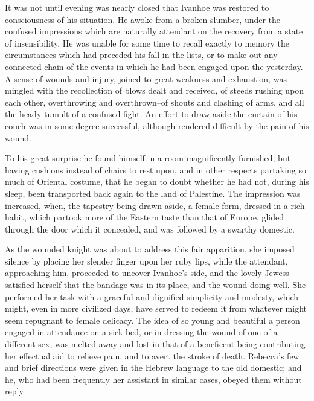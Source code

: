It was not until evening was nearly closed that Ivanhoe was restored to
consciousness of his situation. He awoke from a broken slumber, under
the confused impressions which are naturally attendant on the recovery
from a state of insensibility. He was unable for some time to recall
exactly to memory the circumstances which had preceded his fall in the
lists, or to make out any connected chain of the events in which he had
been engaged upon the yesterday. A sense of wounds and injury, joined to
great weakness and exhaustion, was mingled with the recollection of
blows dealt and received, of steeds rushing upon each other,
overthrowing and overthrown--of shouts and clashing of arms, and all the
heady tumult of a confused fight. An effort to draw aside the curtain of
his couch was in some degree successful, although rendered difficult by
the pain of his wound.

To his great surprise he found himself in a room magnificently
furnished, but having cushions instead of chairs to rest upon, and in
other respects partaking so much of Oriental costume, that he began to
doubt whether he had not, during his sleep, been transported back again
to the land of Palestine. The impression was increased, when, the
tapestry being drawn aside, a female form, dressed in a rich habit,
which partook more of the Eastern taste than that of Europe, glided
through the door which it concealed, and was followed by a swarthy
domestic.

As the wounded knight was about to address this fair apparition, she
imposed silence by placing her slender finger upon her ruby lips, while
the attendant, approaching him, proceeded to uncover Ivanhoe's side, and
the lovely Jewess satisfied herself that the bandage was in its place,
and the wound doing well. She performed her task with a graceful and
dignified simplicity and modesty, which might, even in more civilized
days, have served to redeem it from whatever might seem repugnant to
female delicacy. The idea of so young and beautiful a person engaged in
attendance on a sick-bed, or in dressing the wound of one of a different
sex, was melted away and lost in that of a beneficent being contributing
her effectual aid to relieve pain, and to avert the stroke of death.
Rebecca's few and brief directions were given in the Hebrew language to
the old domestic; and he, who had been frequently her assistant in
similar cases, obeyed them without reply.

